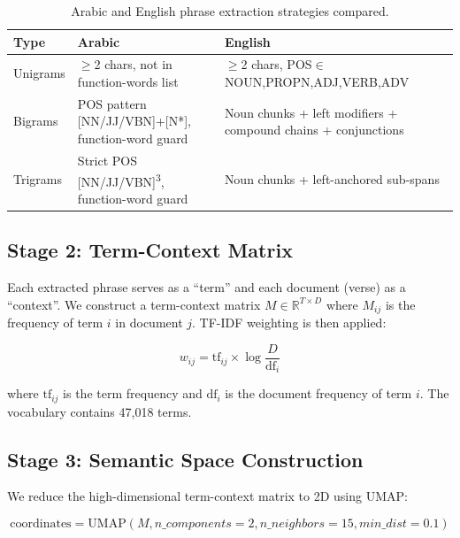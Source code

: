 \documentclass[conference]{IEEEtran}
\begin{document}
\begin{table}[t]
  \centering
  \caption{Arabic and English phrase extraction strategies compared.}
  \label{tab:extraction}
  \footnotesize
  \begin{tabular}{p{2.5cm}p{4.5cm}p{4.5cm}}
    \toprule
    \textbf{Type} & \textbf{Arabic} & \textbf{English} \\
    \midrule
    Unigrams & $\ge$2 chars, not in
    function-words list & $\ge$2 chars, POS$\in$
    {NOUN,PROPN,ADJ,VERB,ADV} \\
    Bigrams & POS pattern
    [NN/JJ/VBN]+[N*],
    function-word guard & Noun chunks + left
    modifiers + compound
    chains + conjunctions \\
    Trigrams & Strict POS
    [NN/JJ/VBN]\textsuperscript{3},
    function-word guard & Noun chunks +
    left-anchored sub-spans \\
    \bottomrule
  \end{tabular}
\end{table}

\subsection{Stage 2: Term-Context Matrix}

Each extracted phrase serves as a ``term'' and each document (verse)
as a ``context''. We construct a term-context matrix
$M \in \mathbb{R}^{T \times D}$ where $M_{ij}$ is the frequency of
term $i$ in document $j$. TF-IDF weighting is then applied:

\begin{equation}
  w_{ij} = \text{tf}_{ij} \times \log\frac{D}{\text{df}_i}
\end{equation}

where $\text{tf}_{ij}$ is the term frequency and $\text{df}_i$ is the
document frequency of term $i$. The vocabulary contains 47,018 terms.

\subsection{Stage 3: Semantic Space Construction}

We reduce the high-dimensional term-context matrix to 2D using UMAP:

\begin{equation}
  \text{coordinates} = \text{UMAP}(M, n\_components=2,
  n\_neighbors=15, min\_dist=0.1)
\end{equation}
\end{document}

